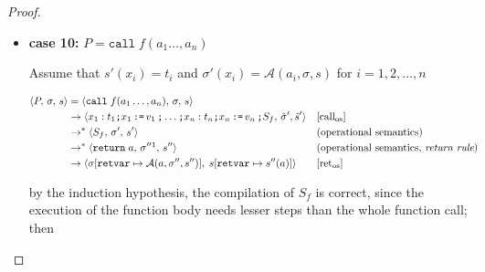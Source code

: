\documentclass{article}
\begin{document}
\begin{proof}
\begin{itemize}
        However, the proofs above are not enough to establish the correctness of the compiled \texttt{while}-statements, because they only demonstrate one step of iteration. Nonetheless, with a simple induction, we can generalize this argument to claim that at any step of iteration, the compilation is correct, as the proofs above show that at any given program state and scope, the compilation of one iteration is correct. To put it more explicitly, the cases of 0 iterations (\textbf{subcase 6.1}) and 1 iteration (\textbf{subcase 6.2}) are proven to be correct. Assuming that $i$ iterations are compiled correctly, \textbf{subcase 6.2} also prove that $i+1$ iterations are compiled correctly. Ultimately, one can certainly say that any terminating \texttt{SelVeri} loop is compiled correctly.


  \item \textbf{case 10:} $P = \texttt{call}\; f(a_1 \dots, a_n)$

  Assume that $s'(x_i) = t_i$ and $\sigma'(x_i) = \mathcal{A}(a_i, \sigma, s)$ for $i = 1,2,\dots,n$

    \[
      \begin{aligned}
      \langle P,\, \sigma,\, s \rangle
      &=\langle \texttt{call}\; f(a_1 \dots, a_n),\, \sigma,\, s \rangle \\
      &\rightarrow \langle x_1 : t_1 \texttt{;} x_1 \,\texttt{:=}\, v_1\, \texttt{;} \dots \texttt{;} x_n : t_n \texttt{;} x_n \,\texttt{:=}\, v_n\, \texttt{;} S_f,\, \tilde{\sigma}', \tilde{s}' \rangle
      && [\text{call}_{\text{os}}]   \\
      &\rightarrow^\ast \langle S_f,\, \sigma' ,\, s' \rangle
      && (\text{operational semantics})   \\
      &\rightarrow^\ast \langle \texttt{return}\; a,\, \sigma'' \footnotemark ,\, s'' \rangle
      && (\text{operational semantics},\, \textit{return rule})   \\
      &\rightarrow \langle \sigma[\texttt{retvar} \mapsto \mathcal{A}(a, \sigma'', s'')],\; s[\texttt{retvar} \mapsto s''(a)] \rangle
      && [\text{ret}_{\text{os}}] \\
      \end{aligned}
  \]

by the induction hypothesis, the compilation of $S_f$ is correct, since the execution of the function body needs lesser steps than the whole function call; then


\end{itemize}
\end{proof}
\end{document}
